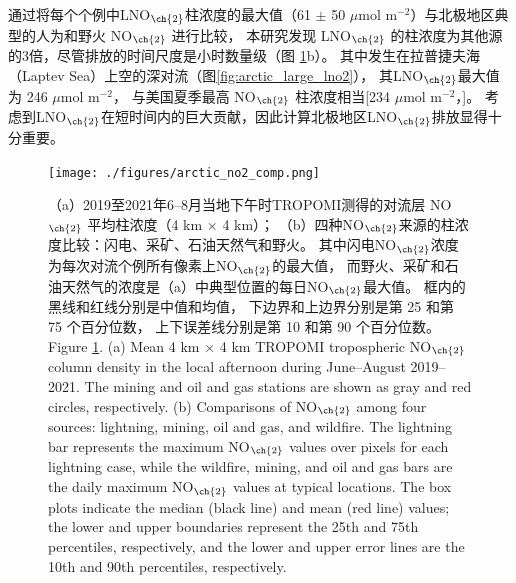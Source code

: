 通过将每个个例中LNO$_{\ch{2}}$柱浓度的最大值（61 $\pm$ 50 $\mu$mol m$^{-2}$）与北极地区典型的人为和野火 NO$_{\ch{2}}$ 进行比较，
本研究发现 LNO$_{\ch{2}}$ 的柱浓度为其他源的3倍，尽管排放的时间尺度是小时数量级（图 \ref{fig:arctic_no2_comp}b）。
其中发生在拉普捷夫海（Laptev Sea）上空的深对流（图\ref{fig:arctic_large_lno2}），
其LNO$_{\ch{2}}$最大值 为 246 $\mu$mol m$^{-2}$，
与美国夏季最高 NO$_{\ch{2}}$ 柱浓度相当[234 $\mu$mol m$^{-2}$，\citet{Goldberg.2021a}]。
考虑到LNO$_{\ch{2}}$在短时间内的巨大贡献，因此计算北极地区LNO$_{\ch{2}}$排放显得十分重要。

\begin{figure}[H]
\centering
\texttt{[image: ./figures/arctic\_no2\_comp.png]}
\caption{
（a）2019至2021年6--8月当地下午时TROPOMI测得的对流层 NO$_{\ch{2}}$ 平均柱浓度（4 km $\times$ 4 km）；
（b）四种NO$_{\ch{2}}$来源的柱浓度比较：闪电、采矿、石油天然气和野火。
其中闪电NO$_{\ch{2}}$浓度为每次对流个例所有像素上NO$_{\ch{2}}$的最大值，
而野火、采矿和石油天然气的浓度是（a）中典型位置的每日NO$_{\ch{2}}$最大值。
框内的黑线和红线分别是中值和均值，
下边界和上边界分别是第 25 和第 75 个百分位数，
上下误差线分别是第 10 和第 90 个百分位数。\\
Figure \ref{fig:arctic_no2_comp}. (a) Mean 4 km $\times$ 4 km TROPOMI tropospheric NO$_{\ch{2}}$ column density in the local afternoon during June--August 2019--2021.
The mining and oil and gas stations are shown as gray and red circles, respectively.
(b) Comparisons of NO$_{\ch{2}}$ among four sources: lightning, mining, oil and gas, and wildfire.
The lightning bar represents the maximum NO$_{\ch{2}}$ values over pixels for each lightning case,
while the wildfire, mining, and oil and gas bars are the daily maximum NO$_{\ch{2}}$ values at typical locations.
The box plots indicate the median (black line) and mean (red line) values; the lower and upper boundaries represent the 25th and 75th percentiles, respectively, and the lower and upper error lines are the 10th and 90th percentiles, respectively.
}
\label{fig:arctic_no2_comp}
\end{figure}

